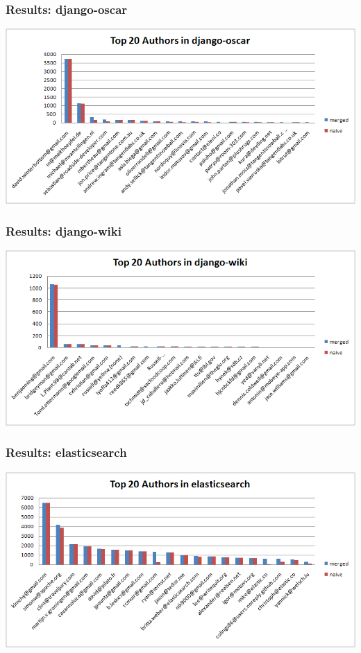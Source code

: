 \documentclass[slidestop,usenames,dvipsnames]{beamer}
\begin{document}
\begin{frame}
  \frametitle{Results: django-oscar}
  \vfill
  \includegraphics[width=\textwidth]{img/graph-django-oscar}
  \vfill
\end{frame}

\begin{frame}
  \frametitle{Results: django-wiki}
  \vfill
  \includegraphics[width=\textwidth]{img/graph-django-wiki}
  \vfill
\end{frame}

\begin{frame}
  \frametitle{Results: elasticsearch}
  \vfill
  \includegraphics[width=\textwidth]{img/graph-elasticsearch}
  \vfill
\end{frame}
\end{document}
